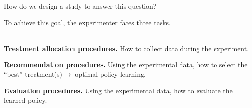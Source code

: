 \documentclass[xcolor={table}]{beamer}
\begin{document}
\note{
\scriptsize \singlespacing

}
\begin{frame}{How do we design a study to answer this question?}

To achieve this goal, the experimenter faces three tasks. \\ \ \\ \pause

\begin{wideitemize}
\item[1.]  \textbf{Treatment allocation procedures.} \pause How to collect data during the experiment.  \pause
\item[2.]  \textbf{Recommendation procedures.} \pause Using the experimental data, how to select the ``best'' treatment(s)$\rightarrow$ optimal policy learning. \pause
\item[2.]  \textbf{Evaluation procedures.} \pause Using the experimental data, how to evaluate the learned policy.
 \end{wideitemize}


\end{frame}
\end{document}
